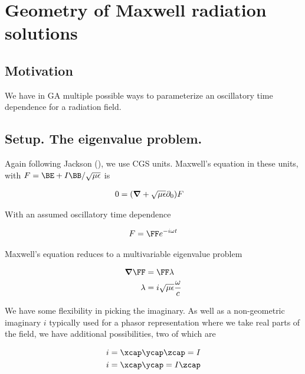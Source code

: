 

\chapter{Geometry of Maxwell radiation solutions}
\label{chap:radiationGeometry}
{}
\date{Aug 14, 2009}

\beginArtWithToc

\section{Motivation}

We have in GA multiple possible ways to parameterize an oscillatory time dependence for a radiation field.  
\section{Setup.  The eigenvalue problem.}

Again following Jackson (\cite{jackson1975cew}), we use CGS units.  Maxwell's equation in these units, with $F = \BE + I\BB/\sqrt{\mu\epsilon}$ is

\begin{align}\label{eqn:foo1}
0 &= (\boldsymbol{\nabla} + \sqrt{\mu\epsilon} \partial_0) F 
\end{align}

With an assumed oscillatory time dependence 

\begin{align}\label{eqn:foo2}
F = \FF e^{-i\omega t}
\end{align}

Maxwell's equation reduces to a multivariable eigenvalue problem

\begin{align}\label{eqn:foo3}
\spacegrad \FF &= \FF \lambda \\
\lambda &= i\sqrt{\mu\epsilon} \frac{\omega}{c} 
\end{align}

We have some flexibility in picking the imaginary.  As well as a non-geometric imaginary $i$ typically used for a phasor representation where we take real parts of the field, we have additional possibilities, two of which are

\begin{align}\label{eqn:foo4}
i &= \xcap\ycap\zcap = I \\
i &= \xcap \ycap = I \zcap
\end{align}

